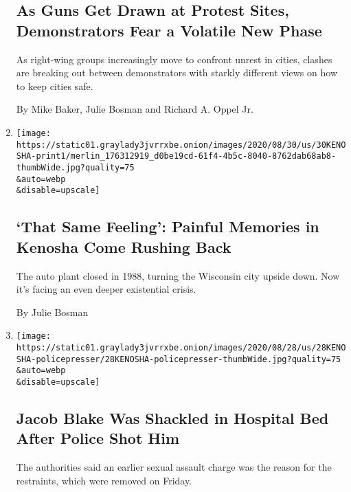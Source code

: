 \begin{enumerate}
  \hypertarget{as-guns-get-drawn-at-protest-sites-demonstrators-fear-a-volatile-new-phase}{%
  \subsection{As Guns Get Drawn at Protest Sites, Demonstrators Fear a
  Volatile New
  Phase}\label{as-guns-get-drawn-at-protest-sites-demonstrators-fear-a-volatile-new-phase}}

  As right-wing groups increasingly move to confront unrest in cities,
  clashes are breaking out between demonstrators with starkly different
  views on how to keep cities safe.

  By Mike Baker, Julie Bosman and Richard A. Oppel Jr.
\item
  \href{/2020/08/29/us/kenosha-wisconsin.html}{}

  \texttt{[image: https://static01.graylady3jvrrxbe.onion/images/2020/08/30/us/30KENOSHA-print1/merlin\_176312919\_d0be19cd-61f4-4b5c-8040-8762dab68ab8-thumbWide.jpg?quality=75\\\&auto=webp\\\&disable=upscale]}

  \hypertarget{that-same-feeling-painful-memories-in-kenosha-come-rushing-back}{%
  \subsection{`That Same Feeling': Painful Memories in Kenosha Come
  Rushing
  Back}\label{that-same-feeling-painful-memories-in-kenosha-come-rushing-back}}

  The auto plant closed in 1988, turning the Wisconsin city upside down.
  Now it's facing an even deeper existential crisis.

  By Julie Bosman
\item
  \href{/2020/08/28/us/jacob-blake-shackles-assault.html}{}

  \texttt{[image: https://static01.graylady3jvrrxbe.onion/images/2020/08/28/us/28KENOSHA-policepresser/28KENOSHA-policepresser-thumbWide.jpg?quality=75\\\&auto=webp\\\&disable=upscale]}

  \hypertarget{jacob-blake-was-shackled-in-hospital-bed-after-police-shot-him}{%
  \subsection{Jacob Blake Was Shackled in Hospital Bed After Police Shot
  Him}\label{jacob-blake-was-shackled-in-hospital-bed-after-police-shot-him}}

  The authorities said an earlier sexual assault charge was the reason
  for the restraints, which were removed on Friday.


\end{enumerate}

